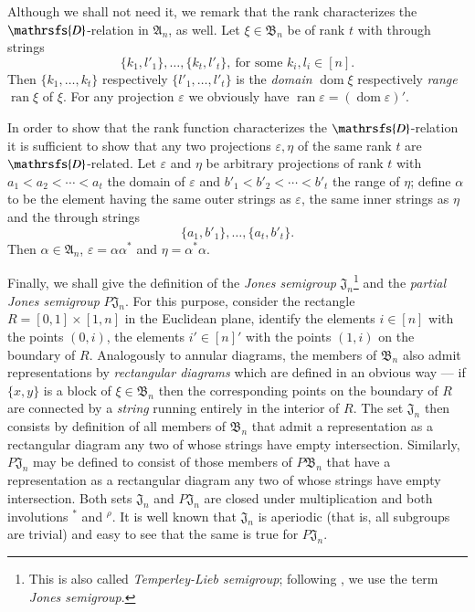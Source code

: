 \documentclass[preprint,1p,times]{elsarticle}
\DeclareMathOperator{\dom}{dom} \DeclareMathOperator{\ran}{ran}
\numberwithin{equation}{section}
\theoremstyle{remark}
\def\Dc{\mathrsfs{D}}
\def\al{\alpha}
\def\ep{\varepsilon}
\def\A{\mathfrak{A}}
\def\B{\mathfrak{B}}
\def\J{\mathfrak{J}}
\begin{document}
Although we shall not need it, we remark that the rank characterizes the $\Dc$-relation in $\A_n$, as well. Let
$\xi\in\B_n$ be of rank $t$ with through strings
$$\{k_1,l'_1\},\dots,\{k_t,l'_t\},\ \mbox{for some } k_i,l_i\in [n].$$
Then $\{k_1,\dots, k_t\}$ respectively $\{l'_1,\dots,l'_t\}$ is the \emph{domain} $\dom \xi$ respectively \emph{range}
$\ran \xi$ of $\xi$. For any projection $\ep$ we obviously have $\ran \ep=(\dom \ep)'$.

In order to show that the rank function characterizes the $\Dc$-relation it is sufficient to show that any two
projections $\ep, \eta$ of the same rank $t$ are $\Dc$-related. Let $\ep$ and $\eta$ be arbitrary projections of rank
$t$ with $a_1<a_2<\cdots<a_t$  the domain of $\ep$ and $b'_1<b'_2<\cdots<b'_t$ the range of $\eta$; define $\alpha$ to
be the element having the same outer strings as $\ep$, the same inner strings as $\eta$ and the through strings
$$\{a_1,b'_1\},\dots,\{a_t,b'_t\}.$$
Then $\alpha\in \A_n$, $\ep=\al\al^*$ and $\eta=\al^*\al$.

Finally, we shall give the definition of the \emph{Jones semigroup} $\J_n$\footnote{This is also called
\emph{Temperley-Lieb semigroup}; following \cite{fitzgerald}, we use the term \emph{Jones semigroup}.}
\cite{temperleylieb, fitzgerald} and the \emph{partial Jones semigroup} $P\J_n$. For this purpose, consider the
rectangle $R=[0,1]\times[1,n]$ in the Euclidean plane, identify the elements $i\in [n]$ with the points $(0,i)$, the
elements $i'\in [n]'$ with the points $(1,i)$ on the boundary of $R$. Analogously to annular diagrams, the members of
$\B_n$ also admit representations by \emph{rectangular diagrams} which are defined in an obvious way --- if $\{x,y\}$
is a block of $\xi\in \B_n$ then the corresponding points on the boundary of $R$ are connected by a \emph{string}
running entirely in the interior of $R$. The set $\J_n$ then consists by definition of all members of $\B_n$ that admit
a representation as a rectangular diagram any two of whose strings have empty intersection.  Similarly, $P\J_n$ may be
defined to consist of those members of $P\B_n$ that have a representation as a rectangular diagram any two of whose
strings have empty intersection. Both sets $\J_n$ and $P\J_n$ are closed under multiplication and both involutions $^*$
and $^\rho$. It is well known that $\J_n$ is aperiodic (that is, all subgroups are trivial) \cite{fitzgerald} and easy
to see that the same is true for $P\J_n$.
\end{document}
